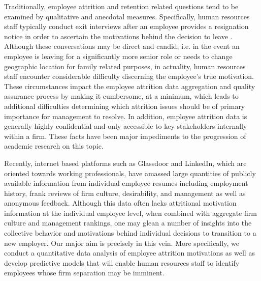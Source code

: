 \documentclass[10pt]{article}
\begin{document}
Traditionally, employee attrition and retention related questions tend to be examined by qualitative and anecdotal 
measures.  Specifically, human resources staff typically conduct exit interviews after an employee provides 
a resignation notice in order to ascertain the motivations behind the decision to leave \cite{Giac1991}.  Although 
these conversations may be direct and candid, i.e. in the event an employee is leaving for a significantly 
more senior role or needs to change geographic location for family related purposes, in actuality, human resources staff
encounter considerable difficulty discerning the employee's true motivation.  
These circumstances impact the employee attrition data aggregation and quality assurance process 
by making it cumbersome, at a minimum, which leads to additional difficulties determining which 
attrition issues should be of primary importance for management to resolve. In addition, employee 
attrition data is generally highly confidential and only accessible to key stakeholders internally 
within a firm.  These facts have been major impediments to the progression of academic research on 
this topic. 

Recently, internet based platforms such as Glassdoor and LinkedIn, which are oriented towards working 
professionals, have amassed large quantities of publicly available information from individual 
employee resumes including employment history, frank reviews of firm culture, desirability, and management
as well as anonymous feedback.  Although this data often lacks attritional motivation information at 
the individual employee level, when combined with aggregate firm culture and management rankings, 
one may glean a number of insights into the collective behavior and motivations behind individual 
decisions to transition to a new employer. Our major aim is precisely in this vein.  More specifically, 
we conduct a quantitative data analysis of employee attrition motivations as well as develop 
predictive models that will enable human resources staff to identify employees whose firm separation 
may be imminent.
\end{document}
